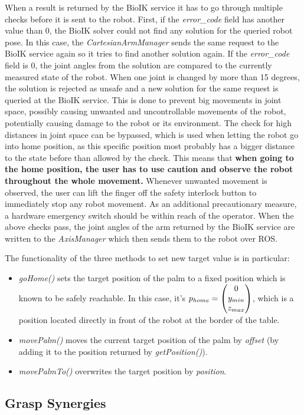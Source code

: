 When a result is returned by the BioIK service it has to go through multiple checks before it is sent to the robot. First, if the \textit{error\_code} field has another value than $0$, the BioIK solver could not find any solution for the queried robot pose. In this case, the \textit{CartesianArmManager} sends the same request to the BioIK service again so it tries to find another solution again. If the \textit{error\_code} field is $0$, the joint angles from the solution are compared to the currently measured state of the robot. When one joint is changed by more than 15 degrees, the solution is rejected as unsafe and a new solution for the same request is queried at the BioIK service. This is done to prevent big movements in joint space, possibly causing unwanted and uncontrollable movements of the robot, potentially causing damage to the robot or its environment. The check for high distances in joint space can be bypassed, which is used when letting the robot go into home position, as this specific position most probably has a bigger distance to the state before than allowed by the check. This means that \textbf{when going to the home position, the user has to use caution and observe the robot throughout the whole movement.} Whenever unwanted movement is observed, the user can lift the finger off the safety interlock button to immediately stop any robot movement. As an additional precautionary measure, a hardware emergency switch should be within reach of the operator. When the above checks pass, the joint angles of the arm returned by the BioIK service are written to the \textit{AxisManager} which then sends them to the robot over ROS.

The functionality of the three methods to set new target value is in particular:
\begin{itemize}
	\item \textit{goHome()} sets the target position of the palm to a fixed position which is known to be safely reachable. In this case, it's $p_{home} = \left( \begin{matrix} 0 \\ y_{min} \\ z_{max} \end{matrix} \right)$, which is a position located directly in front of the robot at the border of the table.
	\item \textit{movePalm()} moves the current target position of the palm by \textit{offset} (by adding it to the position returned by \textit{getPosition()}).
	\item \textit{movePalmTo()} overwrites the target position by \textit{position}.
\end{itemize}

\subsection{Grasp Synergies}

